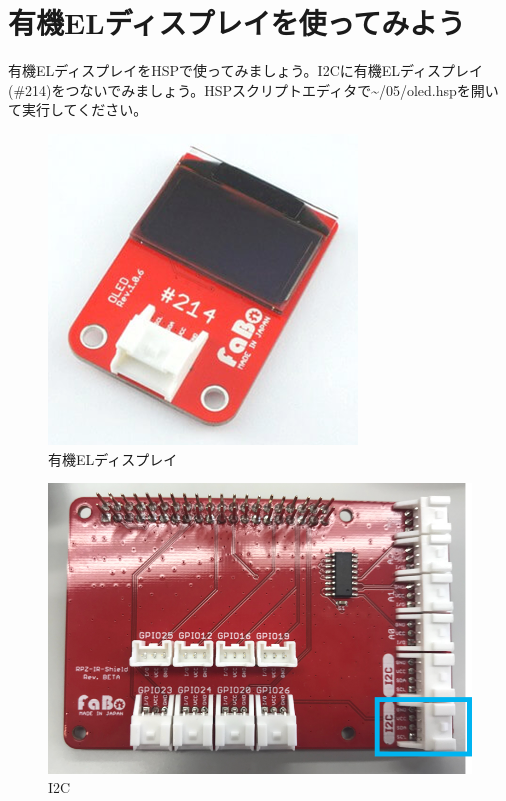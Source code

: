 \newpage
\section{有機ELディスプレイを使ってみよう}
有機ELディスプレイをHSPで使ってみましょう。I2Cに有機ELディスプレイ(\#214)をつないでみましょう。HSPスクリプトエディタで\textasciitilde /05/oled.hspを開いて実行してください。
  \begin{minipage}[t]{0.3\columnwidth}
    \begin{figure}[H]
      \centering
 \includegraphics[width=\linewidth]{images/chap05/text05-img032.png}
    \caption{有機ELディスプレイ}
  \end{figure}
\end{minipage}
  \begin{minipage}[t]{0.5\columnwidth}
    \begin{figure}[H]
      \centering
    \includegraphics[width=\linewidth]{images/chap05/text05-img033.png}
    \caption{I2C}
  \end{figure}
\end{minipage}

